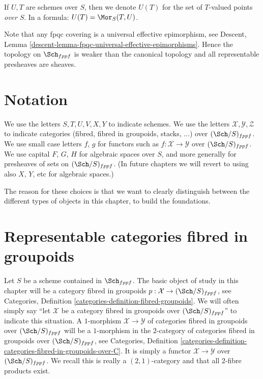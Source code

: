 \medskip\noindent
If $U, T$ are schemes over $S$, then we denote
$U(T)$ for the set of $T$-valued points {\it over} $S$.
In a formula: $U(T) = \Mor_S(T, U)$.

\medskip\noindent
Note that any fpqc covering is a universal effective
epimorphism, see
Descent, Lemma \ref{descent-lemma-fpqc-universal-effective-epimorphisms}.
Hence the topology on $\Sch_{fppf}$
is weaker than the canonical topology and all representable presheaves
are sheaves.








\section{Notation}
\label{section-notation}

\noindent
We use the letters $S, T, U, V, X, Y$ to indicate schemes.
We use the letters $\mathcal{X}, \mathcal{Y}, \mathcal{Z}$ to indicate
categories (fibred, fibred in groupoids, stacks, ...)
over $(\Sch/S)_{fppf}$. We use small case letters
$f$, $g$ for functors such as $f : \mathcal{X} \to \mathcal{Y}$
over $(\Sch/S)_{fppf}$.
We use capital $F$, $G$, $H$ for algebraic spaces over $S$, and more
generally for presheaves of sets on $(\Sch/S)_{fppf}$.
(In future chapters we will revert to using also $X$, $Y$, etc
for algebraic spaces.)

\medskip\noindent
The reason for these choices is that we want to clearly distinguish between
the different types of objects in this chapter, to build the foundations.









\section{Representable categories fibred in groupoids}
\label{section-representable}

\noindent
Let $S$ be a scheme contained in $\Sch_{fppf}$.
The basic object of study in this chapter will be a
category fibred in groupoids
$p : \mathcal{X} \to (\Sch/S)_{fppf}$, see
Categories, Definition \ref{categories-definition-fibred-groupoids}.
We will often simply say ``let $\mathcal{X}$ be a category fibred
in groupoids over $(\Sch/S)_{fppf}$'' to indicate
this situation. A $1$-morphism $\mathcal{X} \to \mathcal{Y}$ of categories
fibred in groupoids over $(\Sch/S)_{fppf}$ will be a $1$-morphism
in the $2$-category of categories fibred in groupoids over
$(\Sch/S)_{fppf}$, see
Categories,
Definition \ref{categories-definition-categories-fibred-in-groupoids-over-C}.
It is simply a functor $\mathcal{X} \to \mathcal{Y}$ over
$(\Sch/S)_{fppf}$.
We recall this is really a $(2, 1)$-category and that all $2$-fibre products
exist.

